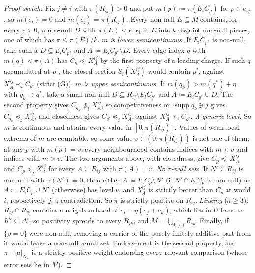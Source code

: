 \documentclass[11pt]{article}
\theoremstyle{definition}
\theoremstyle{remark}
\newcommand{\Di}{\Delta^{\circ}}
\newcommand{\supp}{\operatorname{supp}}
\begin{document}
\begin{proof}[Proof sketch]
Fix $j\ne i$ with $\pi(R_{ij})>0$ and put $m(p)\coloneqq\pi(E_iC_p)$ for $p\in e_{ij}$, so $m(e_i)=0$ and $m(e_j)=\pi(R_{ij})$. Every non-null $E\subseteq M$ contains, for every $\epsilon>0$, a non-null $D$ with $\pi(D)<\epsilon$: split $E$ into $k$ disjoint non-null pieces, one of which has $\pi\le\pi(E)/k$. \emph{$m$ is lower semicontinuous.} If $E_iC_{p^*}$ is non-null, take such a $D\subseteq E_iC_{p^*}$ and $A\coloneqq E_iC_{p^*}\setminus D$. Every edge index $q$ with $m(q)<\pi(A)$ has $C_q\preceq_iX^{ij}_A$ by the first property of a leading charge. If such $q$ accumulated at $p^*$, the closed section $S_i(X^{ij}_A)$ would contain $p^*$, against $X^{ij}_A\prec_iC_{p^*}$ (strict (G)). \emph{$m$ is upper semicontinuous.} If $m(q_k)>m(q^*)+\eta$ with $q_k\to q^*$, take a small non-null $D\subseteq R_{ij}\setminus E_iC_{q^*}$ and $A\coloneqq E_iC_{q^*}\cup D$. The second property gives $C_{q_k}\not\preceq_iX^{ij}_A$, so competitiveness on $\supp q_k\ni j$ gives $C_{q_k}\preceq_jX^{ij}_A$, and closedness gives $C_{q^*}\preceq_jX^{ij}_A$, against $X^{ij}_A\prec_jC_{q^*}$. \emph{A generic level.} So $m$ is continuous and attains every value in $[0,\pi(R_{ij})]$. Values of weak local extrema of $m$ are countable, so some value $v\in(0,\pi(R_{ij}))$ is not one of them; at any $p$ with $m(p)=v$, every neighbourhood contains indices with $m<v$ and indices with $m>v$. The two arguments above, with closedness, give $C_p\preceq_iX^{ij}_A$ and $C_p\preceq_jX^{ij}_A$ for every $A\subseteq R_{ij}$ with $\pi(A)=v$. \emph{No $\pi$-null sets.} If $N'\subseteq R_{ij}$ is non-null with $\pi(N')=0$, then either $A\coloneqq E_iC_p\setminus N'$ (if $N'\cap E_iC_p$ is non-null) or $A\coloneqq E_iC_p\cup N'$ (otherwise) has level $v$, and $X^{ij}_A$ is strictly better than $C_p$ at world $i$, respectively $j$; a contradiction. So $\pi$ is strictly positive on $R_{ij}$. \emph{Linking} ($n\ge3$): $R_{ij}\cap R_{ik}$ contains a neighbourhood of $e_i-\eta(e_j+e_k)$, which lies in $U$ because $K'\subseteq\Di$, so positivity spreads to every $R_{ik}$, and $M=\bigcup_{k\ne i}R_{ik}$. Finally, if $\{\rho=0\}$ were non-null, removing a carrier of the purely finitely additive part from it would leave a non-null $\pi$-null set. Endorsement is the second property, and $\pi+\mu|_{N_+}$ is a strictly positive weight endorsing every relevant comparison (whose error sets lie in $M$).
\end{proof}
\end{document}
